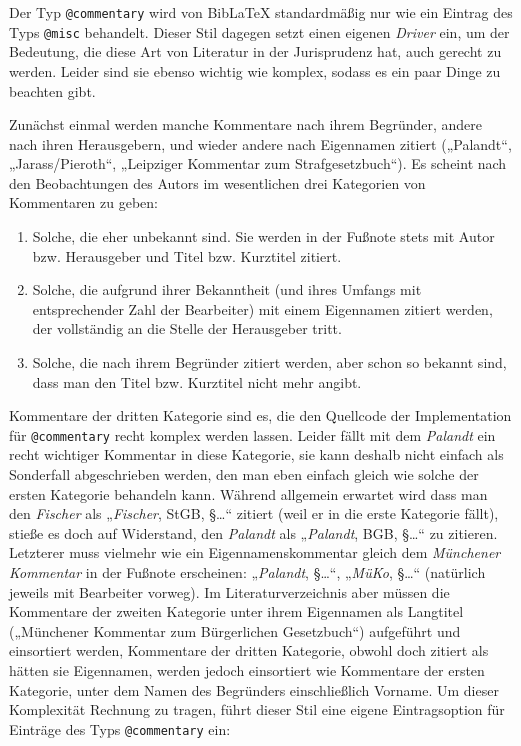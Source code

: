 \documentclass[11pt,a4paper,DIV=calc]{scrartcl}
\newcommand\software[1]{\textsf{#1}}
\newcommand\Biblatex{\software{Bib\LaTeX{}}\xspace}
\newcommand\name[1]{\textit{#1}}
\begin{document}
Der Typ \verb+@commentary+ wird von \Biblatex standardmäßig nur wie
ein Eintrag des Typs \verb+@misc+ behandelt. Dieser Stil dagegen
setzt einen eigenen \emph{Driver} ein, um der Bedeutung, die diese Art
von Literatur in der Jurisprudenz hat, auch gerecht zu werden. Leider
sind sie ebenso wichtig wie komplex, sodass es ein paar Dinge zu
beachten gibt.

Zunächst einmal werden manche Kommentare nach ihrem Begründer, andere
nach ihren Herausgebern, und wieder andere nach Eigennamen zitiert
(„Palandt“, „Jarass/Pieroth“, „Leipziger Kommentar zum
Strafgesetzbuch“). Es scheint nach den Beobachtungen des Autors im
wesentlichen drei Kategorien von Kommentaren zu geben:

\begin{enumerate}
\item Solche, die eher unbekannt sind. Sie werden in der Fußnote stets
  mit Autor bzw. Herausgeber und Titel bzw. Kurztitel zitiert.
\item Solche, die aufgrund ihrer Bekanntheit (und ihres Umfangs mit
  entsprechender Zahl der Bearbeiter) mit einem Eigennamen zitiert
  werden, der vollständig an die Stelle der Herausgeber tritt.
\item Solche, die nach ihrem Begründer zitiert werden, aber schon so
  bekannt sind, dass man den Titel bzw. Kurztitel nicht mehr angibt.
\end{enumerate}

Kommentare der dritten Kategorie sind es, die den Quellcode der
Implementation für \verb+@commentary+ recht komplex werden
lassen. Leider fällt mit dem \name{Palandt} ein recht wichtiger
Kommentar in diese Kategorie, sie kann deshalb nicht einfach als
Sonderfall abgeschrieben werden, den man eben einfach gleich wie
solche der ersten Kategorie behandeln kann. Während allgemein erwartet
wird dass man den \name{Fischer} als „\name{Fischer}, StGB, §…“
zitiert (weil er in die erste Kategorie fällt), stieße es doch auf
Widerstand, den \name{Palandt} als „\name{Palandt}, BGB, §…“ zu
zitieren. Letzterer muss vielmehr wie ein Eigennamenskommentar gleich
dem \name{Münchener Kommentar} in der Fußnote erscheinen:
„\name{Palandt}, §…“, „\name{MüKo}, §…“ (natürlich jeweils mit
Bearbeiter vorweg). Im Literaturverzeichnis aber müssen die Kommentare
der zweiten Kategorie unter ihrem Eigennamen als Langtitel („Münchener
Kommentar zum Bürgerlichen Gesetzbuch“) aufgeführt und einsortiert
werden, Kommentare der dritten Kategorie, obwohl doch zitiert als
hätten sie Eigennamen, werden jedoch einsortiert wie Kommentare der
ersten Kategorie, \dh unter dem Namen des Begründers einschließlich
Vorname. Um dieser Komplexität Rechnung zu tragen, führt dieser Stil
eine eigene Eintragsoption für Einträge des Typs \verb+@commentary+
ein:
\end{document}
